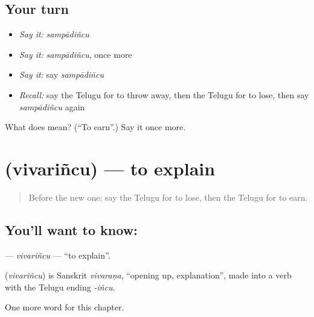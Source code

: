 \subsection*{Your turn}
\begin{itemize}
\raggedright
  \item \emph{Say it:} \emph{sampādiñcu}
  \item \emph{Say it:} \emph{sampādiñcu}, once more
  \item \emph{Say it:} say \emph{sampādiñcu}
  \item \emph{Recall:} say the Telugu for to throw away, then the Telugu for to lose, then say \emph{sampādiñcu} again
\end{itemize}

\begin{tcolorbox}[breakable,colback=teal!4,colframe=teal!35!black,title={Before you move on}]
What does  mean? (\textquotedblleft{}To earn\textquotedblright{}.) Say it once more.
\end{tcolorbox}
\section[\texorpdfstring{\te{వివరించు} (vivariñcu)}{వివరించు (vivariñcu)}]{ (vivariñcu) — to explain}

\label{lesson:TE-C160-vivarincu}



\begin{quote}
Before the new one: say the Telugu for to lose, then the Telugu for to earn.
\end{quote}

\subsection*{You'll want to know: }
\textbf{} — \emph{vivariñcu} — \textquotedblleft{}to explain\textquotedblright{}.

\begin{cousinweb}
\textbf{} (\emph{vivariñcu}) is Sanskrit \emph{vivaraṇa}, \textquotedblleft{}opening up, explanation\textquotedblright{}, made into a verb with the Telugu ending \emph{-iñcu}.
\end{cousinweb}

\begin{grammarlens}[title={What you've built}]
One more word for this chapter.
\end{grammarlens}


